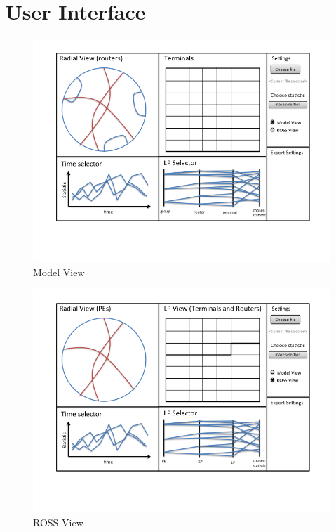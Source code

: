 \documentclass{acm_proc_article-sp}
\begin{document}
\section{User Interface}
\begin{figure}[t]
\centering
   \includegraphics[width=6.5in, clip=true, trim=0 1in 0 0]{../figures/gui-diagram/Slide1.png}
\caption{Model View}
\label{model-view}
\end{figure}

\begin{figure}[t]
\centering
   \includegraphics[width=6.5in, clip=true, trim=0 1in 0 0]{../figures/gui-diagram/Slide2.png}
\caption{ROSS View}
\label{ross-view}
\end{figure}
\end{document}
